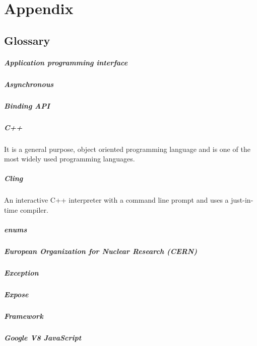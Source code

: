 \chapter{Appendix}
\section{Glossary}
\paragraph{Application programming interface}
\paragraph{Asynchronous}
\paragraph{Binding API}
\paragraph{C++}
It is a general purpose, object oriented programming language and is one of the most widely used programming languages.
\paragraph{Cling}
An interactive C++ interpreter with a command line prompt and uses a just-in-time compiler.
\paragraph{enums}
\paragraph{European Organization for Nuclear Research (CERN)}
\paragraph{Exception}
\paragraph{Expose}
\paragraph{Framework}
\paragraph{Google V8 JavaScript}
